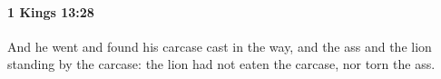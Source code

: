 
		\paragraph{1 Kings 13:28} %
			\label{1KINGS-13-28}

			And he went and found his carcase cast in the way, and the ass and the lion standing by the carcase: the lion had not eaten the carcase, nor torn the ass.


